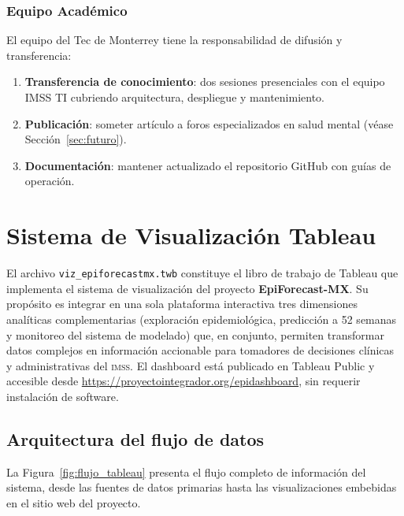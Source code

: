 \documentclass[12pt, letterpaper]{article}
\newcommand{\imss}{\textnormal{\textsc{imss}}}
\newcommand{\figref}[1]{Figura~\ref{#1}}
\newcommand{\secref}[1]{Sección~\ref{#1}}
\begin{document}
\subsubsection{Equipo Académico}

El equipo del Tec de Monterrey tiene la responsabilidad de difusión y transferencia:

\begin{enumerate}[noitemsep]
    \item \textbf{Transferencia de conocimiento}: dos sesiones presenciales con el equipo IMSS TI cubriendo arquitectura, despliegue y mantenimiento.
    \item \textbf{Publicación}: someter artículo a foros especializados en salud mental (véase \secref{sec:futuro}).
    \item \textbf{Documentación}: mantener actualizado el repositorio GitHub con guías de operación.
\end{enumerate}

\newpage
\section{Sistema de Visualización Tableau}\label{sec:tableau}

El archivo \texttt{viz\_epiforecastmx.twb} constituye el libro de trabajo de Tableau que implementa el sistema de visualización del proyecto \textbf{EpiForecast-MX}. Su propósito es integrar en una sola plataforma interactiva tres dimensiones analíticas complementarias (exploración epidemiológica, predicción a 52 semanas y monitoreo del sistema de modelado) que, en conjunto, permiten transformar datos complejos en información accionable para tomadores de decisiones clínicas y administrativas del {\imss}. El dashboard está publicado en Tableau Public y accesible desde \url{https://proyectointegrador.org/epidashboard}, sin requerir instalación de software.

\subsection{Arquitectura del flujo de datos}\label{subsec:flujo_tableau}

La \figref{fig:flujo_tableau} presenta el flujo completo de información del sistema, desde las fuentes de datos primarias hasta las visualizaciones embebidas en el sitio web del proyecto.
\end{document}

